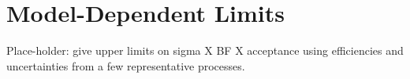 \section{Model-Dependent Limits}

Place-holder: give upper limits on sigma X BF X acceptance using
efficiencies and uncertainties from a few representative processes.